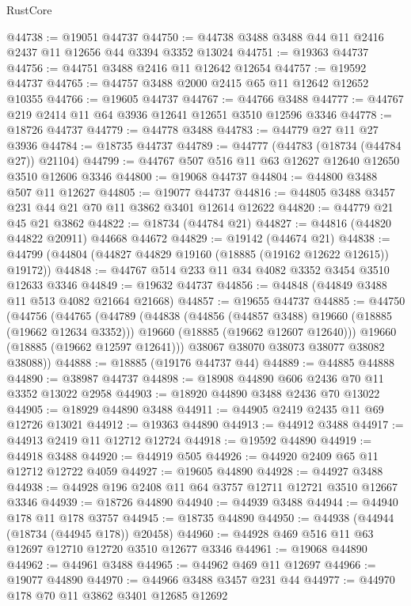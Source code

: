 \begin{lexlean}{RustCore}
\begin{coremodule}
@44738 := @19051 @44737
@44750 := @44738 @3488 @3488 @44 @11 @2416 @2437 @11 @12656 @44 @3394 @3352 @13024
@44751 := @19363 @44737
@44756 := @44751 @3488 @2416 @11 @12642 @12654
@44757 := @19592 @44737
@44765 := @44757 @3488 @2000 @2415 @65 @11 @12642 @12652 @10355
@44766 := @19605 @44737
@44767 := @44766 @3488
@44777 := @44767 @219 @2414 @11 @64 @3936 @12641 @12651 @3510 @12596 @3346
@44778 := @18726 @44737
@44779 := @44778 @3488
@44783 := @44779 @27 @11 @27 @3936
@44784 := @18735 @44737
@44789 := @44777 (@44783 (@18734 (@44784 @27)) @21104)
@44799 := @44767 @507 @516 @11 @63 @12627 @12640 @12650 @3510 @12606 @3346
@44800 := @19068 @44737
@44804 := @44800 @3488 @507 @11 @12627
@44805 := @19077 @44737
@44816 := @44805 @3488 @3457 @231 @44 @21 @70 @11 @3862 @3401 @12614 @12622
@44820 := @44779 @21 @45 @21 @3862
@44822 := @18734 (@44784 @21)
@44827 := @44816 (@44820 @44822 @20911) @44668 @44672
@44829 := @19142 (@44674 @21)
@44838 := @44799 (@44804 (@44827 @44829 @19160 (@18885 (@19162 @12622 @12615)) @19172))
@44848 := @44767 @514 @233 @11 @34 @4082 @3352 @3454 @3510 @12633 @3346
@44849 := @19632 @44737
@44856 := @44848 (@44849 @3488 @11 @513 @4082 @21664 @21668)
@44857 := @19655 @44737
@44885 := @44750
    (@44756
      (@44765
        (@44789
          (@44838
            (@44856 (@44857 @3488) @19660 (@18885 (@19662 @12634 @3352)))
            @19660
            (@18885 (@19662 @12607 @12640)))
          @19660
          (@18885 (@19662 @12597 @12641)))
        @38067
        @38070
        @38073
        @38077
        @38082
        @38088))
@44888 := @18885 (@19176 @44737 @44)
@44889 := @44885 @44888
@44890 := @38987 @44737
@44898 := @18908 @44890 @606 @2436 @70 @11 @3352 @13022 @2958
@44903 := @18920 @44890 @3488 @2436 @70 @13022
@44905 := @18929 @44890 @3488
@44911 := @44905 @2419 @2435 @11 @69 @12726 @13021
@44912 := @19363 @44890
@44913 := @44912 @3488
@44917 := @44913 @2419 @11 @12712 @12724
@44918 := @19592 @44890
@44919 := @44918 @3488
@44920 := @44919 @505
@44926 := @44920 @2409 @65 @11 @12712 @12722 @4059
@44927 := @19605 @44890
@44928 := @44927 @3488
@44938 := @44928 @196 @2408 @11 @64 @3757 @12711 @12721 @3510 @12667 @3346
@44939 := @18726 @44890
@44940 := @44939 @3488
@44944 := @44940 @178 @11 @178 @3757
@44945 := @18735 @44890
@44950 := @44938 (@44944 (@18734 (@44945 @178)) @20458)
@44960 := @44928 @469 @516 @11 @63 @12697 @12710 @12720 @3510 @12677 @3346
@44961 := @19068 @44890
@44962 := @44961 @3488
@44965 := @44962 @469 @11 @12697
@44966 := @19077 @44890
@44970 := @44966 @3488 @3457 @231 @44
@44977 := @44970 @178 @70 @11 @3862 @3401 @12685 @12692

\end{coremodule}
\end{lexlean}
